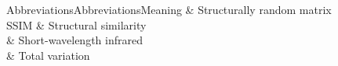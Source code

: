 \begin{notation}
\begin{notationtabular}{Abbreviations}{Abbreviations}{Meaning}
    \abbrSRM{} & Structurally random
matrix\\

	SSIM & Structural similarity\\
	
	\abbrSWIR{} & Short-wavelength infrared\\
	
	\abbrTV{} & Total variation\\
	
  \end{notationtabular}
\end{notation}
